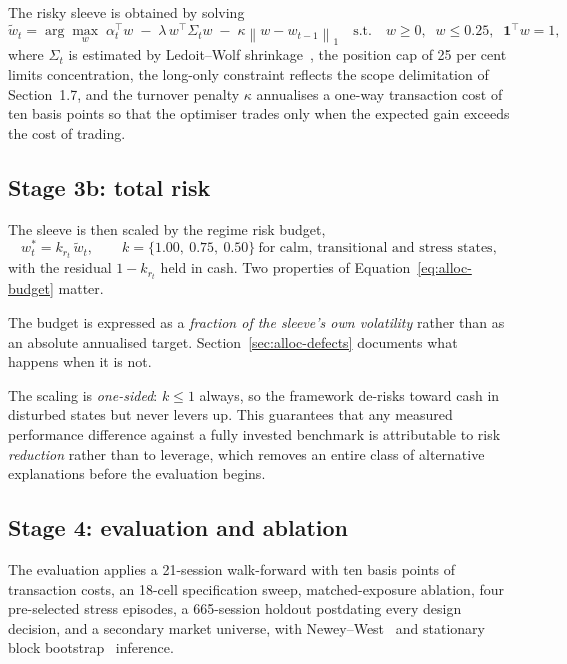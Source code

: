 The risky sleeve is obtained by solving
\begin{equation}
\tilde{w}_t = \arg\max_{w}\;
\alpha_t^{\!\top} w \;-\; \lambda\, w^{\!\top}\Sigma_t w \;-\; \kappa\left\|w - w_{t-1}\right\|_1
\quad\text{s.t.}\quad
w \ge 0,\;\; w \le 0.25,\;\; \mathbf{1}^{\!\top} w = 1,
\label{eq:alloc-qp}
\end{equation}
where $\Sigma_t$ is estimated by Ledoit--Wolf shrinkage~\cite{ledoit2004}, the position cap of 25
per cent limits concentration, the long-only constraint reflects the scope delimitation of
Section~1.7, and the turnover penalty $\kappa$ annualises a one-way transaction cost of ten basis
points so that the optimiser trades only when the expected gain exceeds the cost of trading.

\subsection{Stage 3b: total risk}

The sleeve is then scaled by the regime risk budget,
\begin{equation}
w_t^{*} = k_{r_t}\,\tilde{w}_t,
\qquad
k = \{1.00,\ 0.75,\ 0.50\}\ \text{for calm, transitional and stress states},
\label{eq:alloc-budget}
\end{equation}
with the residual $1 - k_{r_t}$ held in cash. Two properties of
Equation~\eqref{eq:alloc-budget} matter.

The budget is expressed as a \emph{fraction of the sleeve's own volatility} rather than as an
absolute annualised target. Section~\ref{sec:alloc-defects} documents what happens when it is not.

The scaling is \emph{one-sided}: $k \le 1$ always, so the framework de-risks toward cash in
disturbed states but never levers up. This guarantees that any measured performance difference
against a fully invested benchmark is attributable to risk \emph{reduction} rather than to
leverage, which removes an entire class of alternative explanations before the evaluation begins.

\subsection{Stage 4: evaluation and ablation}

The evaluation applies a 21-session walk-forward with ten basis points of transaction costs, an
18-cell specification sweep, matched-exposure ablation, four pre-selected stress episodes, a
665-session holdout postdating every design decision, and a secondary market universe, with
Newey--West~\cite{newey1987} and stationary block bootstrap~\cite{politis1994} inference.

